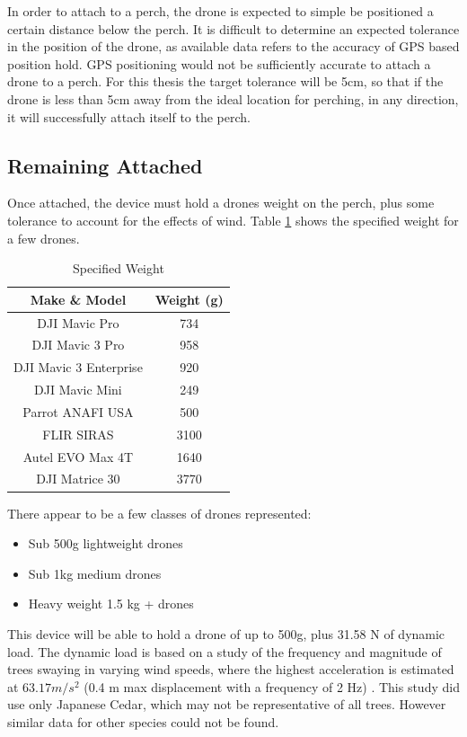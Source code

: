 In order to attach to a perch, the drone is expected to simple be positioned a certain distance below the perch.
It is difficult to determine an expected tolerance in the position of the drone, as available data refers to the accuracy 
of GPS based position hold. GPS positioning would not be sufficiently accurate to attach a drone to a perch. For this 
thesis the target tolerance will be 5cm, so that if the drone is less than 5cm away from the ideal location for perching,
in any direction, it will successfully attach itself to the perch.

\subsection{Remaining Attached}

Once attached, the device must hold a drones weight on the perch, plus some tolerance to account for the effects of wind.
Table \ref{tab:weights} shows the specified weight for a few drones. 

\begin{table}[H]
    \centering
    \caption{Specified Weight}
    \begin{tabular}{| c | c |}
        \hline
        {Make \& Model} & Weight (g) \\
        \hline
        DJI Mavic Pro & 734 \\
        DJI Mavic 3 Pro & 958 \\
        DJI Mavic 3 Enterprise & 920 \\
        DJI Mavic Mini & 249 \\
        Parrot ANAFI USA & 500 \\
        FLIR SIRAS & 3100 \\
        Autel EVO Max 4T & 1640 \\
        DJI Matrice 30 & 3770 \\
        \hline
    \end{tabular}
    \label{tab:weights}
\end{table}

There appear to be a few classes of drones represented:
\begin{itemize}
    \item Sub 500g lightweight drones
    \item Sub 1kg medium drones
    \item Heavy weight 1.5 kg + drones
\end{itemize}

This device will be able to hold a drone of up to 500g, plus 31.58 N
of dynamic load. The dynamic load is based on a study of the frequency and magnitude of 
trees swaying in varying wind speeds, where the highest acceleration is estimated at $63.17 m/s^2$ 
(0.4 m max displacement with a frequency of 2 Hz) \cite{kamimura_energy_2024}. 
This study did use only Japanese Cedar, which may not
be representative of all trees. However similar data for other species could not be found.

